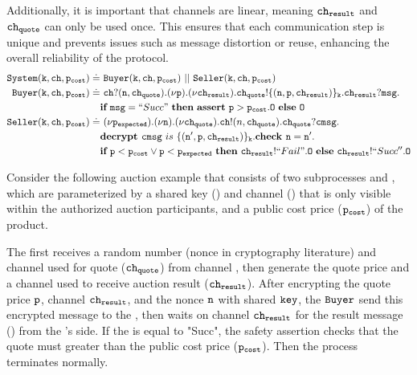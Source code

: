 \documentclass[master,english]{kuisthesis}
\theoremstyle{definition}
\begin{document}
Additionally, it is important that channels are linear, meaning ${\tt ch_{result}}$ and ${\tt ch_{quote}} $ can only be used once. This ensures that each communication step is unique and prevents issues such as message distortion or reuse, enhancing the overall reliability of the protocol.
\begin{align*}
    \Code{System(k,ch, \costprice)} \doteq&\  \Code{Buyer(k,ch,\costprice)} \  || \  \Code{Seller(k,ch, \costprice)}
    \\\Code{Buyer(k,ch, \costprice)} \doteq&\  \Code{ch}?(\nonce, \chq).\newP{\price}.\newP{\chr}.\chq!\{(\nonce, \price, \chr)\}_\Code{k}.\chr?\Code{msg}.
    \\&\iteP{\Code{msg} = \success}{\assertP{\price > \costprice}.\zero}{\zero}
    \\\Code{Seller(k,ch, \costprice)} \doteq&\ \newP{\exprice}.\newP{\nonce}.\newP{\chq}.\Code{ch}!(n, \chq).\chq?\Code{cmsg}.
    \\&\decryptP{\Code{cmsg}}{(\Code{n'}, \price, \chr)}{\Code{k}}.\checkP{\Code{n} = \Code{n'}}.
    \\&\iteP{\price < \costprice \lor \price < \exprice}{\chr!\fail.\zero}{\chr!``Succ''.\mathtt{O}}
\end{align*}

Consider the following auction example that consists of two subprocesses  and , which are parameterized by 
a shared key () and  channel () that is only visible within the authorized auction participants, and a public cost price (${\tt p_{cost}}$) of the product. 

The  first receives a random number  (nonce in cryptography literature) and channel used for quote (${\tt ch_{quote}}$) 
 from channel , then generate the quote price  and a channel used to receive auction result (${\tt ch_{result}}$). After encrypting the quote price ${\tt p}$, channel ${\tt ch_{result}}$, and the nonce ${\tt n}$ with shared ${\tt key}$, the ${\tt Buyer}$ send this encrypted message to the , then waits on channel ${\tt ch_{result}}$ for the result message () from the 's side. If the  is equal to "Succ", the safety assertion checks that the quote  must greater than the public cost price (${\tt p_{cost}}$). Then the  process terminates normally.
 
\end{document}
